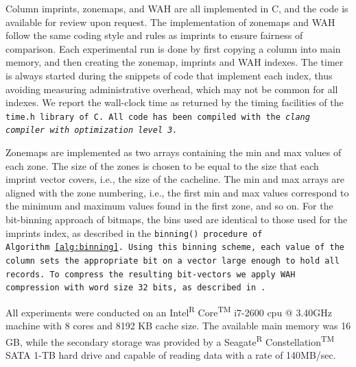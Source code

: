 Column imprints, zonemaps, and WAH are all implemented in C, and the code
is available for review upon request.%
The implementation of zonemaps and WAH follow the
same coding style and rules as imprints to ensure fairness of comparison.
Each experimental run is done by first copying a column into main memory, and
then creating the zonemap, imprints and WAH indexes. The timer is always
started during the snippets of code that implement each index, thus avoiding
measuring administrative overhead, which may not be common for all indexes. We
report the wall-clock time as returned by the timing facilities of the
\tt{time.h} library of C. All code has been compiled with the \it{clang}
compiler with optimization level 3.

Zonemaps are implemented as two arrays containing the min and max values of
each zone. The size of the zones is chosen to be equal to the size that each
imprint vector covers, i.e., the size of the cacheline. The min and max
arrays are aligned with the zone numbering, i.e., the first min and max values
correspond to the minimum and maximum values found in the first zone, and so
on. For the bit-binning approach of bitmaps, the bins used are identical to
those used for the imprints index, as described in the \tt{binning()} procedure
of Algorithm~\ref{alg:binning}. Using this binning scheme, each value of the
column sets the appropriate bit on a vector large enough to hold all records. To
compress the resulting bit-vectors we apply WAH compression with word size
32 bits, as described in~\cite{WOS02}.

All experiments were conducted on an Intel\textsuperscript{R}
Core\textsuperscript{TM} i7-2600 cpu @ 3.40GHz machine with 8 cores and 8192 KB
cache size. The available main memory was 16 GB, while the secondary storage
was provided by a Seagate\textsuperscript{R} Constellation\textsuperscript{TM}
SATA 1-TB hard drive and capable of reading data with a rate of 140MB/sec.

